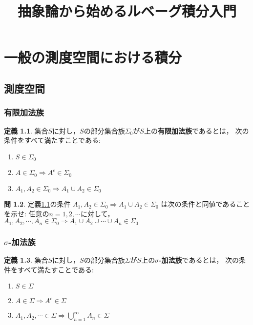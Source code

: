 \documentclass{jsreport}
\title{抽象論から始めるルベーグ積分入門}
\author{}
\theoremstyle{definition}
\newtheorem{defi}{定義}[section]
\newtheorem{qst}[defi]{問}
\begin{document}
\maketitle
\tableofcontents

\part{一般の測度空間における積分}

\chapter{測度空間}

\section{有限加法族}

\begin{defi}\label{def_algebra}
集合$S$に対し，$S$の部分集合族$\Sigma_0$が$S$上の\textbf{有限加法族}であるとは，
次の条件をすべて満たすことである:
\begin{enumerate}
\item$S\in\Sigma_0$
\item$A\in\Sigma_0 \Rightarrow A^c\in\Sigma_0$
\item$A_1,A_2\in\Sigma_0 \Rightarrow A_1 \cup A_2\in\Sigma_0$
\end{enumerate}
\end{defi}

\begin{qst}\label{qst_algebra}
定義\ref{def_algebra}の条件
$A_1,A_2\in\Sigma_0 \Rightarrow A_1 \cup A_2\in\Sigma_0$
は次の条件と同値であることを示せ:
任意の$n=1,2,\cdots$に対して，
$A_1,A_2,\cdots,A_n\in\Sigma_0 \Rightarrow A_1 \cup A_2 \cup\cdots\cup A_n\in\Sigma_0$
\end{qst}

\section{$\sigma$-加法族}

\begin{defi}\label{def_sigma_algebra}
集合$S$に対し，$S$の部分集合族$\Sigma$が$S$上の\textbf{$\sigma$-加法族}であるとは，
次の条件をすべて満たすことである:
\begin{enumerate}
\item$S\in\Sigma$
\item$A\in\Sigma \Rightarrow A^c\in\Sigma$
\item$A_1,A_2,\cdots\in\Sigma \Rightarrow \displaystyle \bigcup_{n=1}^\infty A_n\in\Sigma$
\end{enumerate}
\end{defi}
\end{document}
